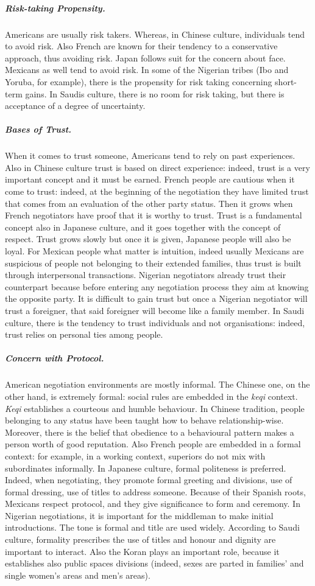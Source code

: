 \documentclass[../main.tex]{subfiles}
\begin{document}
\subparagraph{Risk-taking Propensity.} Americans are usually risk takers. Whereas, in Chinese culture, individuals tend to avoid risk. Also French are known for their tendency to a conservative approach, thus avoiding risk. Japan follows suit for the concern about face. Mexicans as well tend to avoid risk. In some of the Nigerian tribes (Ibo and Yoruba, for example), there is the propensity for risk taking concerning short-term gains. In Saudis culture, there is no room for risk taking, but there is acceptance of a degree of uncertainty.

\subparagraph{Bases of Trust.} When it comes to trust someone, Americans tend to rely on past experiences. Also in Chinese culture trust is based on direct experience: indeed, trust is a very important concept and it must be earned. French people are cautious when it come to trust: indeed, at the beginning of the negotiation they have limited trust that comes from an evaluation of the other party status. Then it grows when French negotiators have proof that it is worthy to trust. Trust is a fundamental concept also in Japanese culture, and it goes together with the concept of respect. Trust grows slowly but once it is given, Japanese people will also be loyal. For Mexican people what matter is intuition, indeed usually Mexicans are suspicious of people not belonging to their extended families, thus trust is built through interpersonal transactions. Nigerian negotiators already trust their counterpart because before entering any negotiation process they aim at knowing the opposite party. It is difficult to gain trust but once a Nigerian negotiator will trust a foreigner, that said foreigner will become like a family member. In Saudi culture, there is the tendency to trust individuals and not organisations: indeed, trust relies on personal ties among people.

\subparagraph{Concern with Protocol.} American negotiation environments are mostly informal. The Chinese one, on the other hand, is extremely formal: social rules are embedded in the \textit{keqi} context. \textit{Keqi} establishes a courteous and humble behaviour. In Chinese tradition, people belonging to any status have been taught how to behave relationship-wise. Moreover, there is the belief that obedience to a behavioural pattern makes a person worth of good reputation. Also French people are embedded in a formal context: for example, in a working context, superiors do not mix with subordinates informally. In Japanese culture, formal politeness is preferred. Indeed, when negotiating, they promote formal greeting and divisions, use of formal dressing, use of titles to address someone. Because of their Spanish roots, Mexicans respect protocol, and they give significance to form and ceremony. In Nigerian negotiations, it is important for the middleman to make initial introductions. The tone is formal and title are used widely. According to Saudi culture, formality prescribes the use of titles and honour and dignity are important to interact. Also the Koran plays an important role, because it establishes also public spaces divisions (indeed, sexes are parted in families' and single women's areas and men's areas).
\end{document}
